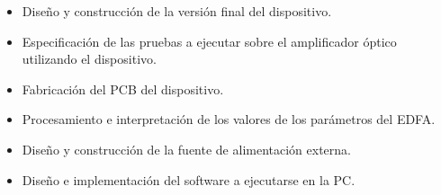 \begin{itemize}
\item Diseño y construcción de la versión final del dispositivo.
\item Especificación de las pruebas a ejecutar sobre el amplificador óptico utilizando el dispositivo.
\item Fabricación del PCB del dispositivo.
\item Procesamiento e interpretación de los valores de los parámetros del EDFA.
\item Diseño y construcción de la fuente de alimentación externa.
\item Diseño e implementación del software a ejecutarse en la PC.
\end{itemize}


